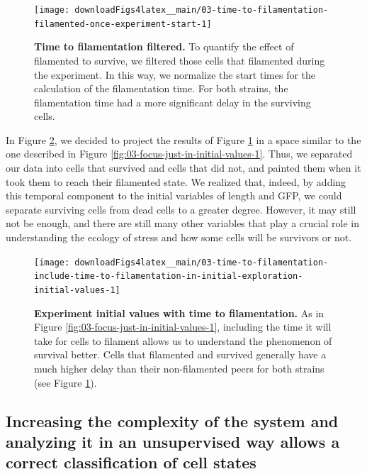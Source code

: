 \documentclass[a4paper, nobind]{templates/ociamthesis}
\begin{document}
\begin{figure}[H]
\texttt{[image: downloadFigs4latex\_\_main/03-time-to-filamentation-filamented-once-experiment-start-1]} \caption[Time to filamentation filtered.]{\textbf{Time to filamentation filtered.} To quantify the effect of filamented to survive, we filtered those cells that filamented during the experiment. In this way, we normalize the start times for the calculation of the filamentation time. For both strains, the filamentation time had a more significant delay in the surviving cells.}\label{fig:03-time-to-filamentation-filamented-once-experiment-start-1}
\end{figure}

In Figure \ref{fig:03-time-to-filamentation-include-time-to-filamentation-in-initial-exploration-initial-values-1}, we decided to project the results of Figure \ref{fig:03-time-to-filamentation-filamented-once-experiment-start-1} in a space similar to the one described in Figure \ref{fig:03-focus-just-in-initial-values-1}.
Thus, we separated our data into cells that survived and cells that did not, and painted them when it took them to reach their filamented state.
We realized that, indeed, by adding this temporal component to the initial variables of length and GFP, we could separate surviving cells from dead cells to a greater degree.
However, it may still not be enough, and there are still many other variables that play a crucial role in understanding the ecology of stress and how some cells will be survivors or not.





\begin{figure}[H]
\texttt{[image: downloadFigs4latex\_\_main/03-time-to-filamentation-include-time-to-filamentation-in-initial-exploration-initial-values-1]} \caption[Experiment initial values with time to filamentation.]{\textbf{Experiment initial values with time to filamentation.} As in Figure \ref{fig:03-focus-just-in-initial-values-1}, including the time it will take for cells to filament allows us to understand the phenomenon of survival better. Cells that filamented and survived generally have a much higher delay than their non-filamented peers for both strains (see Figure \ref{fig:03-time-to-filamentation-filamented-once-experiment-start-1}).}\label{fig:03-time-to-filamentation-include-time-to-filamentation-in-initial-exploration-initial-values-1}
\end{figure}

\hypertarget{increasing-the-complexity-of-the-system-and-analyzing-it-in-an-unsupervised-way-allows-a-correct-classification-of-cell-states}{%
\subsection{Increasing the complexity of the system and analyzing it in an unsupervised way allows a correct classification of cell states}\label{increasing-the-complexity-of-the-system-and-analyzing-it-in-an-unsupervised-way-allows-a-correct-classification-of-cell-states}}
\end{document}
